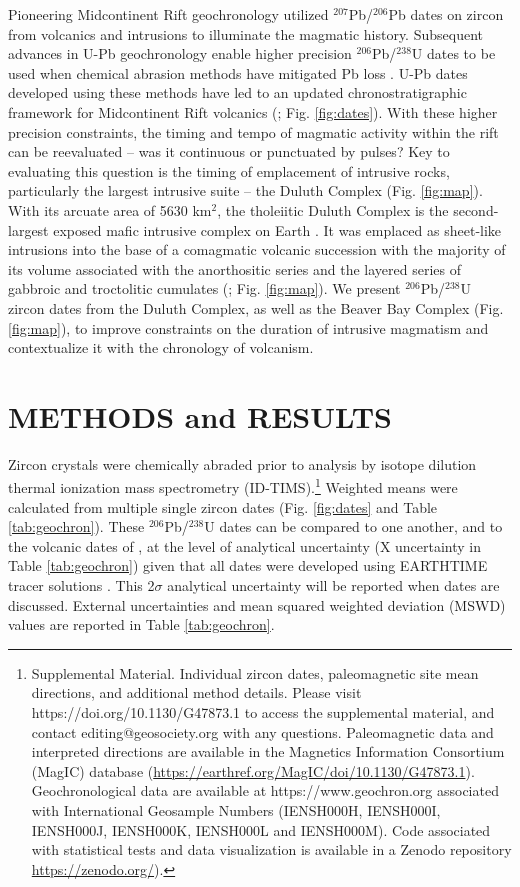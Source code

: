 \documentclass[11pt,letterpaper]{article}
\begin{document}
Pioneering Midcontinent Rift geochronology utilized $^{207}$Pb/$^{206}$Pb dates on zircon from volcanics \citep{Davis1997a} and intrusions \citep{Paces1993a} to illuminate the magmatic history. Subsequent advances in U-Pb geochronology enable higher precision $^{206}$Pb/$^{238}$U dates to be used when chemical abrasion methods have mitigated Pb loss \citep{Mattinson2005a}.  U-Pb dates developed using these methods have led to an updated chronostratigraphic framework for Midcontinent Rift volcanics (\citealp{Swanson-Hysell2019a}; Fig. \ref{fig:dates}). With these higher precision constraints, the timing and tempo of magmatic activity within the rift can be reevaluated -- was it continuous or punctuated by pulses? Key to evaluating this question is the timing of emplacement of intrusive rocks, particularly the largest intrusive suite -- the Duluth Complex (Fig. \ref{fig:map}). With its arcuate area of 5630 km$^2$, the tholeiitic Duluth Complex is the second-largest exposed mafic intrusive complex on Earth \citep{Miller2002c}. It was emplaced as sheet-like intrusions into the base of a comagmatic volcanic succession with the majority of its volume associated with the anorthositic series and the layered series of gabbroic and troctolitic cumulates (\citealp{Miller2002c}; Fig. \ref{fig:map}). We present $^{206}$Pb/$^{238}$U zircon dates from the Duluth Complex, as well as the Beaver Bay Complex (Fig. \ref{fig:map}), to improve constraints on the duration of intrusive magmatism and contextualize it with the chronology of volcanism.

\section*{METHODS and RESULTS}

Zircon crystals were chemically abraded prior to analysis by isotope dilution thermal ionization mass spectrometry (ID-TIMS).\footnote{Supplemental Material. Individual zircon dates, paleomagnetic site mean directions, and additional method details. Please visit https://doi.org/10.1130/G47873.1 to access the supplemental material, and contact editing@geosociety.org with any questions. Paleomagnetic data and interpreted directions are available in the Magnetics Information Consortium (MagIC) database (\url{https://earthref.org/MagIC/doi/10.1130/G47873.1}). Geochronological data are available at https://www.geochron.org associated with International Geosample Numbers (IENSH000H, IENSH000I, IENSH000J, IENSH000K, IENSH000L and IENSH000M). Code associated with statistical tests and data visualization is available in a Zenodo repository \url{https://zenodo.org/}).} Weighted means were calculated from multiple single zircon dates (Fig. \ref{fig:dates} and Table \ref{tab:geochron}). These $^{206}$Pb/$^{238}$U dates can be compared to one another, and to the volcanic dates of \cite{Swanson-Hysell2019a}, at the level of analytical uncertainty (X uncertainty in Table \ref{tab:geochron}) given that all dates were developed using EARTHTIME tracer solutions \citep{Condon2015a}. This 2$\sigma$ analytical uncertainty will be reported when dates are discussed. External uncertainties and mean squared weighted deviation (MSWD) values are reported in Table \ref{tab:geochron}.
\end{document}
